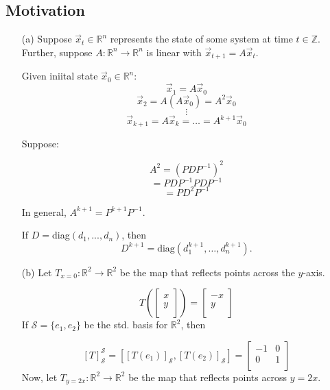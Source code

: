 \documentclass[a4paper,10pt]{article}
\theoremstyle{definition}
\begin{document}
\subsection{Motivation}
\begin{enumerate}
\item[(a)] Suppose $\vec{x}_t \in \mathbb{R}^n$ represents the state of some system at time $t \in \mathbb{Z}$. Further, suppose $A: \mathbb{R}^n \to \mathbb{R}^n$ is linear with $\vec{x}_{t+1} = A\vec{x}_t$.

Given iniital state $\vec{x}_0 \in \mathbb{R}^n$:
$$\vec{x}_1 = A \vec{x}_0$$
$$\vec{x}_2 = A(A \vec{x}_0) = A^2 \vec{x}_0$$
$$\vdots$$
$$\vec{x}_{k+1} = A\vec{x}_k = \ldots = A^{k+1}\vec{x}_0$$

Suppose:
\begin{center}
	
\end{center}

$$A^2 = (PDP^{-1})^2$$
$$=PDP^{-1} PDP^{-1}$$
$$=PD^2P^{-1}$$

In general, $A^{k+1} = P^{k+1}P^{-1}$.

If $D=$diag$(d_1,...,d_n)$, then 
$$D^{k+1} = \text{diag}(d_1^{k+1}, \ldots, d_n^{k+1}).$$

\item[(b)] Let $T_{x=0}: \mathbb{R}^2 \to \mathbb{R}^2$ be the map that reflects points across the $y$-axis.

$$T\left(
\begin{bmatrix}
	x \\
	y \\
\end{bmatrix}
\right)
=
\begin{bmatrix}
	-x \\
	y \\
\end{bmatrix}
$$
If $\mathcal{S} = 	\{ e_1, e_2 \}$ be the std. basis for $\mathbb{R}^2$, then

$$
[T]_\mathcal{S}^\mathcal{S} = [[T(e_1)]_\mathcal{S}, [T(e_2)]_\mathcal{S}]
=
\begin{bmatrix}
	-1 & 0 \\
	0 & 1 \\
\end{bmatrix}
$$
Now, let $T_{y=2x}: \mathbb{R}^2 \to \mathbb{R}^2$ be the map that reflects points across $y=2x$.


\end{enumerate}
\end{document}
